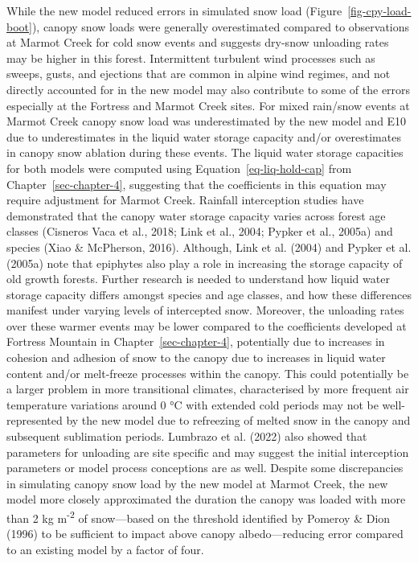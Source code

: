 \documentclass[
  letterpaper,
]{tex/uofsthesis-cs}
\begin{document}
While the new model reduced errors in simulated snow load
(Figure~\ref{fig-cpy-load-boot}), canopy snow loads were generally
overestimated compared to observations at Marmot Creek for cold snow
events and suggests dry-snow unloading rates may be higher in this
forest. Intermittent turbulent wind processes such as sweeps, gusts, and
ejections that are common in alpine wind regimes, and not directly
accounted for in the new model may also contribute to some of the errors
especially at the Fortress and Marmot Creek sites. For mixed rain/snow
events at Marmot Creek canopy snow load was underestimated by the new
model and E10 due to underestimates in the liquid water storage capacity
and/or overestimates in canopy snow ablation during these events. The
liquid water storage capacities for both models were computed using
Equation~\ref{eq-liq-hold-cap} from Chapter~\ref{sec-chapter-4},
suggesting that the coefficients in this equation may require adjustment
for Marmot Creek. Rainfall interception studies have demonstrated that
the canopy water storage capacity varies across forest age classes
(Cisneros Vaca et al., 2018; Link et al., 2004; Pypker et al., 2005a)
and species (Xiao \& McPherson, 2016). Although, Link et al. (2004) and
Pypker et al. (2005a) note that epiphytes also play a role in increasing
the storage capacity of old growth forests. Further research is needed
to understand how liquid water storage capacity differs amongst species
and age classes, and how these differences manifest under varying levels
of intercepted snow. Moreover, the unloading rates over these warmer
events may be lower compared to the coefficients developed at Fortress
Mountain in Chapter~\ref{sec-chapter-4}, potentially due to increases in
cohesion and adhesion of snow to the canopy due to increases in liquid
water content and/or melt-freeze processes within the canopy. This could
potentially be a larger problem in more transitional climates,
characterised by more frequent air temperature variations around 0 °C
with extended cold periods may not be well-represented by the new model
due to refreezing of melted snow in the canopy and subsequent
sublimation periods. Lumbrazo et al. (2022) also showed that parameters
for unloading are site specific and may suggest the initial interception
parameters or model process conceptions are as well. Despite some
discrepancies in simulating canopy snow load by the new model at Marmot
Creek, the new model more closely approximated the duration the canopy
was loaded with more than 2 kg m\textsuperscript{-2} of snow---based on
the threshold identified by Pomeroy \& Dion (1996) to be sufficient to
impact above canopy albedo---reducing error compared to an existing
model by a factor of four.
\end{document}

